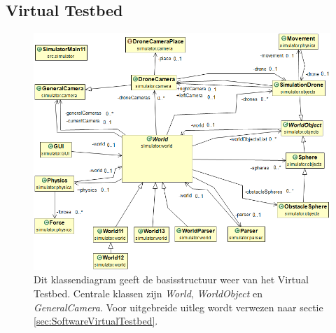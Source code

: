 \subsection{Virtual Testbed}
	\begin{figure}[H]
		\centering
		\includegraphics[width=1\textwidth]{Simulator.png}
		\caption{Dit klassendiagram geeft de basisstructuur weer van het Virtual Testbed. Centrale klassen  zijn \textit{World}, \textit{WorldObject} en \textit{GeneralCamera}. Voor uitgebreide uitleg wordt verwezen naar sectie \ref{sec:SoftwareVirtualTestbed}.}
	\end{figure}